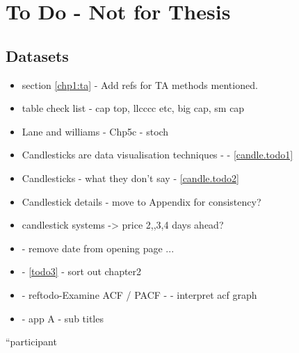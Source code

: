 
\chapter{To Do - Not for Thesis} %

\label{Chapter7} %



\section{Datasets}


\begin{itemize}
\item section \ref{chp1:ta} - Add refs for TA methods mentioned.
\item table check list - cap top, llcccc etc, big cap, sm cap
\item Lane \cite{lane1986using} and williams \cite{williams2011long} \cite{williams1989definitive} - Chp5c - stoch
\item Candlesticks are data visualisation techniques - - \ref{candle.todo1}
\item Candlesticks - what they don't say - \ref{candle.todo2}
\item Candlestick details - move to Appendix for consistency?
\item candlestick systems -> price 2,,3,4 days ahead?
\item - remove date from opening page ...
\item - \ref{todo3} - sort out chapter2
\item - ref{todo-Examine ACF / PACF} - - interpret acf graph
\item - app A - sub titles
\end{itemize}


\textquotedblleft participant